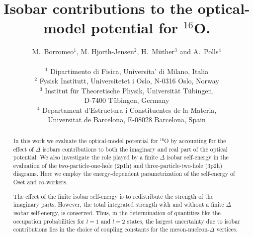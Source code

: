




\setlength{\hoffset}{-0.5in}
\setlength{\textwidth}{6in}
\setlength{\voffset}{-0.5in}
\setlength{\textheight}{8.5in}
\newcommand{\be}{\begin{equation}}
\newcommand{\ee}{\end{equation}}
\newcommand{\bra}[1]{\left\langle #1 \right|}
\newcommand{\ket}[1]{\left| #1 \right\rangle}



\pagestyle{plain}
\title{Isobar contributions to the optical-model potential for $^{16}$O.}
\author{M.\ Borromeo$^1$, M. Hjorth-Jensen$^2$, H.\ M\"{u}ther$^3$
and A.\ Polls$^4$\\\\
$^1$ Dipartimento di Fisica, Universita' di Milano, Italia
\\
$^2$ Fysisk Institutt, Universitetet i Oslo, N-0316 Oslo, Norway\\
$^3$ Institut f\"{u}r Theoretische Physik, Universit\"{a}t T\"{u}bingen,\\
D-7400 T\"{u}bingen, Germany
\\ $^4$ Departament d'Estructura i Constituentes de la Materia,\\
Universitat de Barcelona, E-08028 Barcelona, Spain}
\maketitle


\begin{abstract}
In this work we evaluate the optical-model potential for $^{16}$O
by accounting for the effect of $\Delta$ isobars  contributions to
both the imaginary and real
part of the optical potential.
We also investigate the role played
by a
finite $\Delta$ isobar self-energy
in the evaluation of the two-particle-one-hole (2p1h)
and three-particle-two-hole (3p2h)
diagrams. Here we employ the energy-dependent parametrization 
of the self-energy of Oset and co-workers.

The effect of the finite isobar self-energy is to redistribute
the strength of the imaginary parts.
However, the total integrated strength with and without a finite 
$\Delta$ isobar self-energy, is conserved.
Thus, in the
determination of quantities like the occupation probabilities for
$l=1$ and $l=2$ states, the largest uncertainty due to isobar contributions
lies in the choice of coupling constants for the meson-nucleon-$\Delta$ 
vertices.
\end{abstract}


